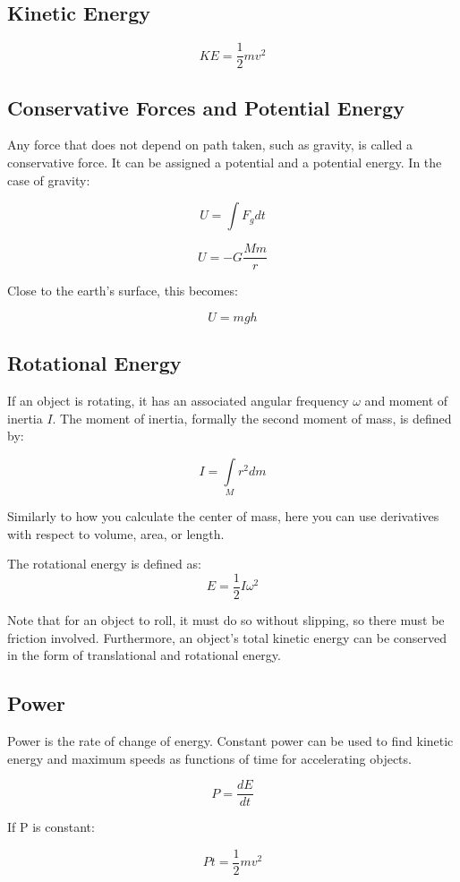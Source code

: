 \documentclass{article}
\begin{document}
\subsection{Kinetic Energy}

$$KE=\frac{1}{2}mv^2$$

\subsection{Conservative Forces and Potential Energy}

Any force that does not depend on path taken, such as gravity, is called a conservative force. It can be assigned a potential and a potential energy. In the case of gravity:

$$U=\int F_g dt$$

$$U=-G\frac{Mm}{r}$$

Close to the earth's surface, this becomes:

$$U=mgh$$

\subsection{Rotational Energy}

If an object is rotating, it has an associated angular frequency $\omega$ and moment of inertia $I$. The moment of inertia, formally the second moment of mass, is defined by:

$$I=\int\limits_{M} r^2 dm $$

Similarly to how you calculate the center of mass, here you can use derivatives with respect to volume, area, or length.

The rotational energy is defined as:
$$E=\frac{1}{2}I\omega^2$$

Note that for an object to roll, it must do so without slipping, so there must be friction involved. Furthermore, an object's total kinetic energy can be conserved in the form of translational and rotational energy.

\subsection{Power}

Power is the rate of change of energy. Constant power can be used to find kinetic energy and maximum speeds as functions of time for accelerating objects.

$$P=\frac{dE}{dt}$$

If P is constant:

$$Pt=\frac{1}{2}mv^2$$
\end{document}
